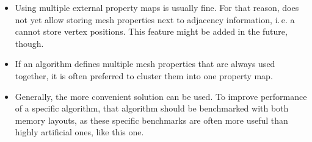 \begin{itemize}
  \item Using multiple external property maps is usually fine.
  For that reason,  does not yet allow storing mesh properties next to adjacency information, i.\,e. a  cannot store vertex positions.
  This feature might be added in the future, though.
  \item If an algorithm defines multiple mesh properties that are always used together, it is often preferred to cluster them into one property map.
  \item Generally, the more convenient solution can be used.
  To improve performance of a specific algorithm, that algorithm should be benchmarked with both memory layouts, as these specific benchmarks are often more useful than highly artificial ones, like this one.
\end{itemize}
